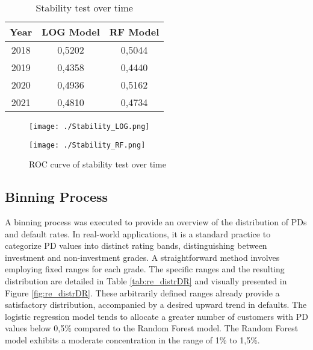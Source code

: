\begin{table}[H]
\centering
\begin{tabular}{ccc}\toprule
\textbf{Year} & \textbf{LOG Model} & \textbf{RF Model} \\\midrule
2018          & 0,5202             & 0,5044            \\
2019          & 0,4358             & 0,4440            \\
2020          & 0,4936             & 0,5162            \\
2021          & 0,4810             & 0,4734        	\\\bottomrule   
\end{tabular}
\caption{Stability test over time}
\label{tab:re_stab}
\end{table}

\begin{figure}[H]
\begin{minipage}{.5\textwidth}
	\centering
	\texttt{[image: ./Stability\_LOG.png]}
\end{minipage}%
\begin{minipage}{.5\textwidth}
	\centering
	\texttt{[image: ./Stability\_RF.png]}
\end{minipage}
    \caption{ROC curve of stability test over time}
    \label{fig:re_rocstab}
\end{figure}

\subsection{Binning Process}
A binning process was executed to provide an overview of the distribution of PDs and default rates. In real-world applications, it is a standard practice to categorize PD values into distinct rating bands, distinguishing between investment and non-investment grades. A straightforward method involves employing fixed ranges for each grade. The specific ranges and the resulting distribution are detailed in Table \ref{tab:re_distrDR} and visually presented in Figure \ref{fig:re_distrDR}. These arbitrarily defined ranges already provide a satisfactory distribution, accompanied by a desired upward trend in defaults. The logistic regression model tends to allocate a greater number of customers with PD values below 0,5\% compared to the Random Forest model. The Random Forest model exhibits a moderate concentration in the range of 1\% to 1,5\%.

